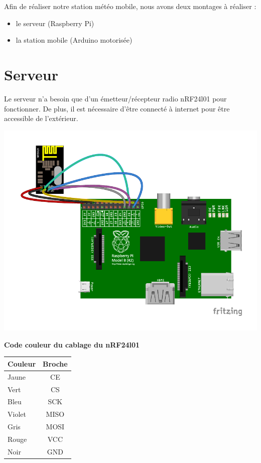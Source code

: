 Afin de réaliser notre station météo mobile, nous avons deux montages à
réaliser :
\begin{itemize}
\item le serveur (Raspberry Pi)
\item la station mobile (Arduino motorisée)
\end{itemize}

\section{Serveur}
Le serveur n'a besoin que d'un émetteur/récepteur radio nRF24l01 pour
fonctionner. De plus, il est nécessaire d'être connecté à internet pour être
accessible de l'extérieur.

\begin{center}
\includegraphics[scale=1]{include/raspberry_bb.pdf}
\end{center}


\textbf{Code couleur du cablage du nRF24l01}\\
\begin{center}
\begin{tabular}{l|c}
Couleur & Broche \\
\hline
Jaune  & CE\\
Vert   & CS\\
Bleu   & SCK\\
Violet & MISO\\
Gris   & MOSI\\
Rouge  & VCC\\
Noir   & GND
\end{tabular}
\end{center}
\pagebreak
